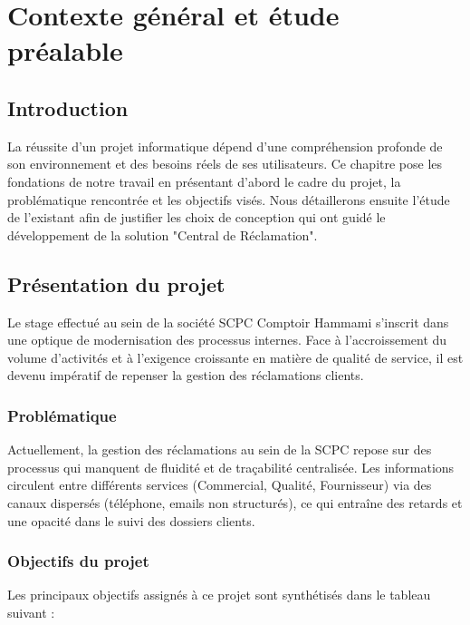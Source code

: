 \chapter{Contexte général et étude préalable}

\section*{Introduction}
La réussite d'un projet informatique dépend d'une compréhension profonde de son environnement et des besoins réels de ses utilisateurs. Ce chapitre pose les fondations de notre travail en présentant d'abord le cadre du projet, la problématique rencontrée et les objectifs visés. Nous détaillerons ensuite l'étude de l'existant afin de justifier les choix de conception qui ont guidé le développement de la solution "Central de Réclamation".

\section{Présentation du projet}
Le stage effectué au sein de la société SCPC Comptoir Hammami s'inscrit dans une optique de modernisation des processus internes. Face à l'accroissement du volume d'activités et à l'exigence croissante en matière de qualité de service, il est devenu impératif de repenser la gestion des réclamations clients.

\subsection{Problématique}
Actuellement, la gestion des réclamations au sein de la SCPC repose sur des processus qui manquent de fluidité et de traçabilité centralisée. Les informations circulent entre différents services (Commercial, Qualité, Fournisseur) via des canaux dispersés (téléphone, emails non structurés), ce qui entraîne des retards et une opacité dans le suivi des dossiers clients.

\subsection{Objectifs du projet}
Les principaux objectifs assignés à ce projet sont synthétisés dans le tableau suivant :

